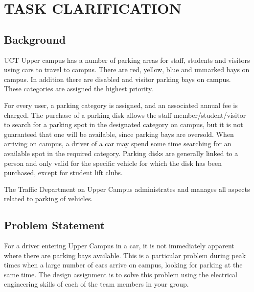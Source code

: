 
\newpage
\tableofcontents



\newcommand{\lsec}[1]{\normalsize{\textbf{#1}}\\}

\newpage

\section{TASK CLARIFICATION}
\subsection{Background}
UCT Upper campus has a number of parking areas for staff, students and visitors using cars to travel to campus. There are red, yellow, blue and unmarked bays on campus. In addition there are disabled and 
visitor parking bays on campus. These categories are assigned the highest priority. 

For every user, a parking category is assigned, and an associated annual fee is charged.  The purchase of a parking disk allows the staff member/student/visitor to search for a parking spot in the designated category on campus, but it is not guaranteed that one will be available, since parking bays are oversold. When arriving on campus, a driver of a car may spend some time searching for an available spot in the required category. Parking disks are generally linked to a person and only valid for the specific vehicle for which the disk has been purchased, except for student lift clubs.

The Traffic  Department  on  Upper  Campus  administrates  and  manages  all  aspects  related  to  parking  of vehicles.\cite{assignment}
 
\subsection{Problem Statement}
For  a  driver  entering  Upper  Campus  in  a  car,  it  is  not immediately  apparent  where  there  are  parking bays available.  This is a particular problem during peak times when a large number of cars arrive on campus, looking for parking at the same time. The design assignment is to solve this problem using the electrical engineering skills of each of the team members in your group.\cite{assignment}

